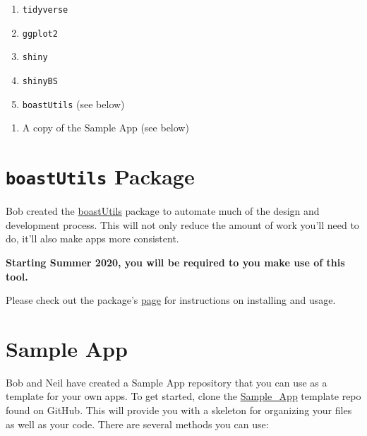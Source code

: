 \documentclass[]{book}
\providecommand{\tightlist}{%
  \setlength{\itemsep}{0pt}\setlength{\parskip}{0pt}}
\begin{document}
\begin{enumerate}
\def\labelenumi{\alph{enumi}.}
\tightlist
\item
  \texttt{tidyverse}~\\
\item
  \texttt{ggplot2}~\\
\item
  \texttt{shiny}~\\
\item
  \texttt{shinyBS}~\\
\item
  \texttt{boastUtils} (see below)\\
\end{enumerate}

\begin{enumerate}
\def\labelenumi{\arabic{enumi}.}
\setcounter{enumi}{4}
\tightlist
\item
  A copy of the Sample App (see below)
\end{enumerate}

\hypertarget{boastutils-package}{%
\section{\texorpdfstring{\texttt{boastUtils} Package}{boastUtils Package}}\label{boastutils-package}}

Bob created the \href{https://github.com/EducationShinyAppTeam/boastUtils}{boastUtils} package to automate much of the design and development process. This will not only reduce the amount of work you'll need to do, it'll also make apps more consistent.

\textbf{Starting Summer 2020, you will be required to you make use of this tool.}

Please check out the package's \href{https://github.com/EducationShinyAppTeam/boastUtils}{page} for instructions on installing and usage.

\hypertarget{sample-app}{%
\section{Sample App}\label{sample-app}}

Bob and Neil have created a Sample App repository that you can use as a template for your own apps. To get started, clone the \href{https://github.com/EducationShinyAppTeam/Sample_App}{Sample\_App} template repo found on GitHub. This will provide you with a skeleton for organizing your files as well as your code. There are several methods you can use:
\end{document}
